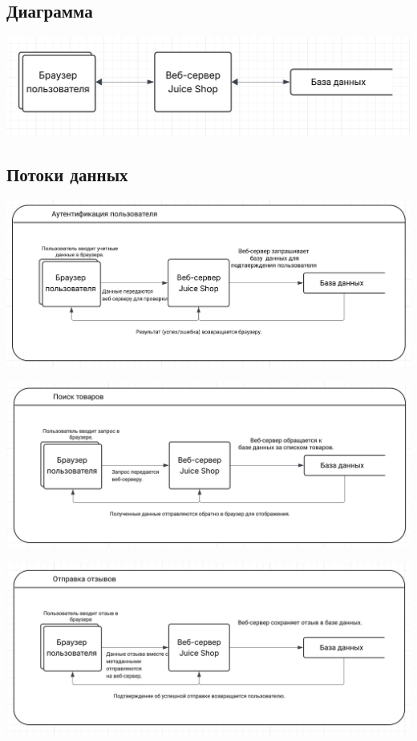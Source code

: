 \documentclass{article}
\begin{document}
\subsection{Диаграмма}

\begin{center}
  \includegraphics[width=.9\textwidth]{dfd}
\end{center}

\subsection{Потоки данных}

\begin{center}
  \includegraphics[width=.9\textwidth]{auth}
\end{center}

\begin{center}
  \includegraphics[width=.9\textwidth]{sear}
\end{center}

\begin{center}
  \includegraphics[width=.9\textwidth]{fee}
\end{center}
\end{document}
